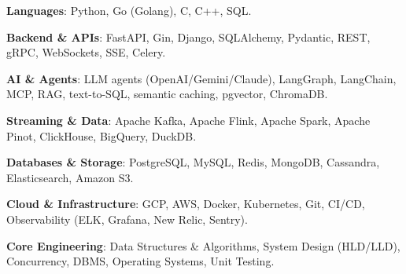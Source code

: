 \begin{zitemize}
\item \textbf{Languages}: Python, Go (Golang), C, C++, SQL.
\item \textbf{Backend \& APIs}: FastAPI, Gin, Django, SQLAlchemy, Pydantic, REST, gRPC, WebSockets, SSE, Celery.
\item \textbf{AI \& Agents}: LLM agents (OpenAI/Gemini/Claude), LangGraph, LangChain, MCP, RAG, text-to-SQL, semantic caching, pgvector, ChromaDB.
\item \textbf{Streaming \& Data}: Apache Kafka, Apache Flink, Apache Spark, Apache Pinot, ClickHouse, BigQuery, DuckDB.
\item \textbf{Databases \& Storage}: PostgreSQL, MySQL, Redis, MongoDB, Cassandra, Elasticsearch, Amazon S3.
\item \textbf{Cloud \& Infrastructure}: GCP, AWS, Docker, Kubernetes, Git, CI/CD, Observability (ELK, Grafana, New Relic, Sentry).
\item \textbf{Core Engineering}: Data Structures \& Algorithms, System Design (HLD/LLD), Concurrency, DBMS, Operating Systems, Unit Testing.
\end{zitemize}
